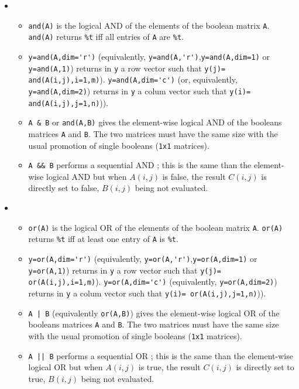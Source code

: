 \begin{mandescription}
  \begin{itemize} 
  \item {}
  \begin{itemize} 
  \item \verb!and(A)! is the logical AND of the elements of the boolean matrix \verb!A!. 
    \verb!and(A)! returns \verb!%t! iff all entries of \verb!A! are \verb!%t!. 
  \item \verb!y=and(A,dim='r')! (equivalently, \verb!y=and(A,'r')!,\verb!y=and(A,dim=1)! or \verb!y=and(A,1)!) 
    returns in \verb!y! a row vector such that \verb!y(j)= and(A(i,j),i=1,m)!). 
    \verb!y=and(A,dim='c')! (or, equivalently, \verb!y=and(A,dim=2)!) returns in \verb!y! a colum vector 
    such that \verb!y(i)= and(A(i,j),j=1,n)!)).
  \item \verb!A & B! or \verb!and(A,B)! gives the element-wise logical AND
    of the booleans matrices \verb!A! and  \verb!B!. The two matrices must have the same size 
    with the usual promotion of single booleans (\verb!1x1! matrices). 
  \item \verb!A && B! performs a sequential AND ; this is the same than 
    the element-wise logical AND but when $A(i,j)$ is false, the result $C(i,j)$
    is directly set to false, $B(i,j)$ being not evaluated.
  \end{itemize}
  \item {}
  \begin{itemize} 
  \item \verb!or(A)! is the logical OR of the elements of the boolean matrix \verb!A!. 
    \verb!or(A)! returns \verb!%t! iff at least one entry of \verb!A! is \verb!%t!. 
  \item \verb!y=or(A,dim='r')! (equivalently, \verb!y=or(A,'r')!,\verb!y=or(A,dim=1)! or \verb!y=or(A,1)!) 
    returns in \verb!y! a row vector such that \verb!y(j)= or(A(i,j),i=1,m)!). 
    \verb!y=or(A,dim='c')! (equivalently, \verb!y=or(A,dim=2)!) returns in \verb!y! a colum vector 
    such that \verb!y(i)= or(A(i,j),j=1,n)!)).
  \item \verb!A | B! (equivalently \verb!or(A,B)!) gives the element-wise logical  OR
    of the booleans matrices \verb!A! and  \verb!B!. The two matrices must have the same size 
    with the usual promotion of single booleans (\verb!1x1! matrices). 
  \item \verb!A || B! performs a sequential OR ; this is the same than 
    the element-wise logical OR but when $A(i,j)$ is true, the result $C(i,j)$
    is directly set to true, $B(i,j)$ being not evaluated.
  \end{itemize} 
\end{itemize}

\end{mandescription}

